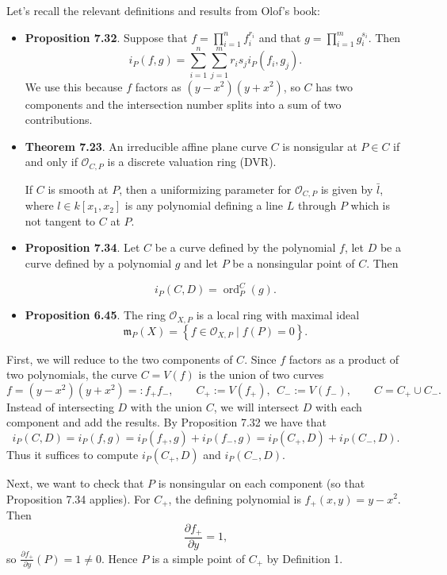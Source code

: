 \documentclass[a4paper,12pt,openany]{article}
\theoremstyle{plain}
\theoremstyle{definition}
\theoremstyle{remark}
\begin{document}
\medskip

Let's recall the relevant definitions and results from Olof's book:
\begin{itemize}
\item \textbf{Proposition 7.32}.
Suppose that $f=\prod_{i=1}^n f_i^{r_i}$ and that $g=\prod_{i=1}^m g_i^{s_i}$. Then $$i_P(f, g)=\sum_{i=1}^n \sum_{j=1}^m r_i s_j i_P\left(f_i, g_j\right).
$$
We use this because $f$ factors as $(y-x^2)(y+x^2)$, so $C$ has two components and the intersection number splits into a sum of two contributions.

\item \textbf{Theorem 7.23}. An irreducible affine plane curve $C$ is nonsigular at $P \in C$ if and only if $\mathcal{O}_{C, P}$ is a discrete valuation ring (DVR).

If $C$ is smooth at $P$, then a uniformizing parameter for $\mathcal{O}_{C, P}$ is given by $\bar{l}$, where $l \in k\left[x_1, x_2\right]$ is any polynomial defining a line $L$ through $P$ which is not tangent to $C$ at $P$.


\item \textbf{Proposition 7.34}. Let $C$ be a curve defined by the polynomial $f$, let $D$ be a curve defined by a polynomial $g$ and let $P$ be a nonsingular point of $C$. Then

$$
i_P(C, D)=\operatorname{ord}_P^C(g) .
$$

\item \textbf{Proposition 6.45}. The ring $\mathcal{O}_{X, P}$ is a local ring with maximal ideal
$$
\mathfrak{m}_P(X)=\left\{f \in \mathcal{O}_{X, P} \mid f(P)=0\right\} .
$$
\end{itemize}

\medskip

First, we will reduce to the two components of $C$.
Since $f$ factors as a product of two polynomials, the curve $C=V(f)$ is the union of two curves
\[
f=(y-x^{2})(y+x^{2})=:f_{+}f_{-},
\qquad
C_{+}:=V(f_{+}),\ \ C_{-}:=V(f_{-}),
\qquad
C=C_{+}\cup C_{-}.
\]
Instead of intersecting $D$ with the union $C$, we will intersect $D$ with each component and add the results.
By Proposition 7.32 we have that
\[
i_{P}(C,D)=i_{P}(f,g)=i_{P}(f_{+},g)+i_{P}(f_{-},g)
= i_{P}(C_{+},D)+i_{P}(C_{-},D).
\]
Thus it suffices to compute $i_{P}(C_{+},D)$ and $i_{P}(C_{-},D)$.

\medskip

Next, we want to check that $P$ is nonsingular on each component (so that Proposition 7.34 applies).
For $C_{+}$, the defining polynomial is $f_{+}(x,y)=y-x^{2}$. Then
\[
\frac{\partial f_{+}}{\partial y}=1,
\]
so $\frac{\partial f_{+}}{\partial y}(P)=1\neq 0$. Hence $P$ is a simple point of $C_{+}$ by Definition 1.
\end{document}
